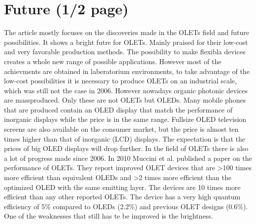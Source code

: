 \section{Future (1/2 page)}
The article mostly focuses on the discoveries made in the OLETs field and future possibilities. It shows a bright futre for OLETs. Mainly praised for their low-cost and very favorable production methods. The possibility to make flexibla devices creates a whole new range of possible applications. However most of the achievments are obtained in laberatorium environments, to take advantage of the low-cost possibilities it is necessary to produce OLETs on an industrial scale, which was still not the case in 2006. However nowadays organic photonic devices are massproduced. Only these are not OLETs but OLEDs. Many mobile phones that are produced contain an OLED display that match the performance of inorganic displays while the price is in the same range. Fullsize OLED television screens are also available on the consumer market, but the price is almost ten times higher than that of inorganic (LCD) displays. The expectation is that the prices of big OLED displays will drop further. In the field of OLETs there is also a lot of progress made since 2006. In 2010 Muccini et al. published a paper on the performance of OLETs. They report improved OLET devices that are >100 times more efficient than equivalent OLEDs and >2 times more efficient than the optimized OLED with the same emitting layer. The devices are 10 times more efficient than any other reported OLETs. The device has a very high quantum efficiency of 5\% compared to OLEDs (2.2\%) and previous OLET designs (0.6\%). One of the weaknesses that still has te be improved is the brightness.
